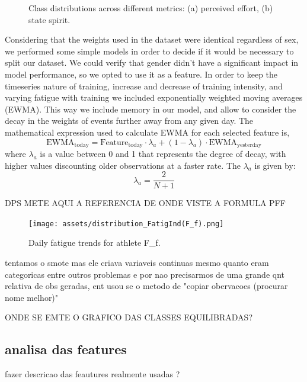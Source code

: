 \documentclass[conference]{IEEEtran}
\begin{document}
\begin{figure}[H]
    \caption{Class distributions across different metrics: (a) perceived effort, (b) state spirit.}
    \label{classdist_feat}
\end{figure}

Considering that the weights used in the dataset were identical regardless of sex, we performed some simple models in order to decide if it would be necessary to split our dataset. We could verify that gender didn't have a significant impact in model performance, so we opted to use it as a feature.
In order to keep the timeseries nature of training, increase and decrease of training intensity, and varying fatigue with training we included exponentially weighted moving averages (EWMA). This way we include memory in our model, and allow to consider the decay in the weights of events further away from any given day. The mathematical expression used to calculate EWMA for each selected feature is,
\begin{equation*}
    \text{EWMA}_{\text{today}} = \text{Feature}_{\text{today}} \cdot \lambda_a + (1 - \lambda_a) \cdot \text{EWMA}_{\text{yesterday}}
\end{equation*}
where $\lambda_a$ is a value between 0 and 1 that represents the degree of decay, with higher values discounting older observations at a faster rate. The $\lambda_a$ is given by:
\begin{equation*}
    \lambda_a = \frac{2}{N + 1}
\end{equation*} 

DPS METE AQUI A REFERENCIA DE ONDE VISTE A FORMULA PFF


\begin{figure}[H]
    \centering
    \texttt{[image: assets/distribution\_FatigInd(F\_f).png]}
    \caption{Daily fatigue trends for athlete F\_f.}
    \label{fatig_Ff}
\end{figure}

tentamos o smote mas ele criava variaveis continuas mesmo quanto eram categoricas entre outros problemas e por nao precisarmos de uma grande qnt relativa de obs geradas, ent usou se o metodo de "copiar obervacoes (procurar nome melhor)"

ONDE SE EMTE O GRAFICO DAS CLASSES EQUILIBRADAS?



\subsection{analisa das features}

fazer descricao das feautures realmente usadas ?
\end{document}
